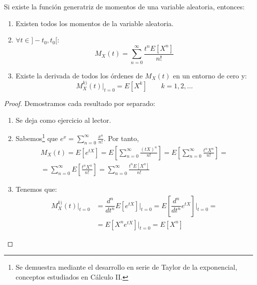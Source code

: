 \begin{teo} 
    Si existe la función generatriz de momentos de una variable aleatoria, entonces:
    \begin{enumerate}
        \item Existen todos los momentos de la variable aleatoria.

        \item $\forall t \in ]-t_0, t_0[$:
        $$M_X(t) = \sum_{n=0}^\infty \dfrac{t^nE[X^n]}{n!}$$

        \item Existe la derivada de todos los órdenes de $M_X(t)$ en un entorno de cero y:
        $$M_X^{k)}(t)\Big|_{t=0} = E[X^k] \qquad k = 1, 2, \ldots$$
    \end{enumerate}
\end{teo}
\begin{proof}
    Demostramos cada resultado por separado:
    \begin{enumerate}
        \item Se deja como ejercicio al lector.
        \item Sabemos\footnote{Se demuestra mediante el desarrollo en serie de Taylor de la exponencial, conceptos estudiados en Cálculo II.} que $e^x = \sum\limits_{n=0}^\infty \frac{x^n}{n!}$. Por tanto,
        \begin{multline*}
            M_X(t)=E[e^{tX}]
            = E\left[\sum_{n=0}^\infty \frac{(tX)^n}{n!}\right]
            = E\left[\sum_{n=0}^\infty \frac{t^n X^n}{n!}\right]
            =\\= \sum_{n=0}^\infty E\left[ \frac{t^n X^n}{n!}\right]
            = \sum_{n=0}^\infty \frac{t^n E\left[X^n\right]}{n!}
        \end{multline*}

        \item Tenemos que:
        \begin{align*}
            M_X^{k)}(t)\Big|_{t=0} &= \dfrac{d^n}{dt^n}E[e^{tX}]\Big|_{t=0} = E\left[\dfrac{d^n}{dt^n}e^{tX}\right]\Big|_{t=0} =\\
            &= E\left[X^n e^{tX}\right]\Big|_{t=0} = E[X^n]
        \end{align*}
    \end{enumerate}
\end{proof}

